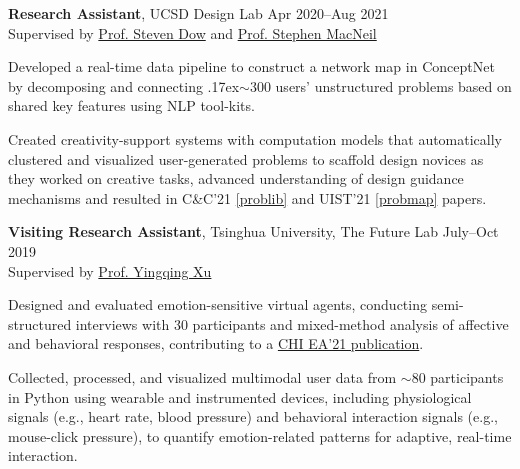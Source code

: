 \documentclass[a4paper,11pt]{article}
\begin{document}
\vspace{0.2cm}


\textbf{Research Assistant},
{UCSD Design Lab}
\hfill {Apr 2020--Aug 2021}\\
Supervised by \href{https://spdow.ucsd.edu/}{Prof. Steven Dow} and \href{http://stevemacn.github.io/}{Prof. Stephen MacNeil} 
\begin{innerlist}
\item Developed a real-time data pipeline to construct a network map in ConceptNet by decomposing and connecting {\raise.17ex\hbox{$\scriptstyle\sim$}}300 users’ unstructured problems based on shared key features using NLP tool-kits.
\item Created creativity-support systems with computation models that automatically clustered and visualized user-generated problems to scaffold design novices as they worked on creative tasks, advanced understanding of design guidance mechanisms and resulted in C\&C'21 \ref{problib} and UIST'21 \ref{probmap} papers.
\end{innerlist}
\vspace{0.3cm}


\textbf{Visiting Research Assistant},
{Tsinghua University, The Future Lab}
\hfill {July--Oct 2019}\\
Supervised by \href{https://www.enad.tsinghua.edu.cn/info/1027/1334.htm}{Prof. Yingqing Xu}
\begin{innerlist}
\item Designed and evaluated emotion-sensitive virtual agents, conducting semi-structured interviews with 30 participants and mixed-method analysis of affective and behavioral responses, contributing to a \href{https://dl.acm.org/doi/10.1145/3411763.3451660}{CHI EA'21 publication}.

\item Collected, processed, and visualized multimodal user data from $\sim$80 participants in Python using wearable and instrumented devices, including physiological signals (e.g., heart rate, blood pressure) and behavioral interaction signals (e.g., mouse-click pressure), to quantify emotion-related patterns for adaptive, real-time interaction.
\end{innerlist}
\end{document}
